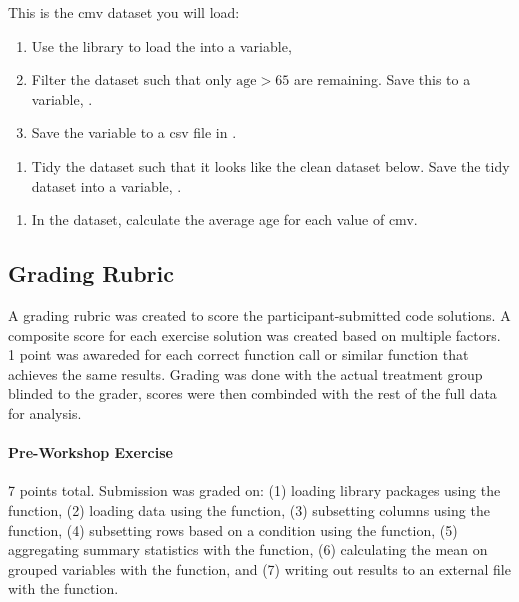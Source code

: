 \documentclass[040-assessment.tex]{subfiles}
\begin{document}
    \begin{displayquote}

        This is the cmv dataset you will load:

        \begin{enumerate}
            \item Use the  library to load the  into a variable, 
            \item Filter the  dataset such that only $\text{age} > 65$ are remaining.
                  Save this to a variable, .
            \item Save the  variable to a csv file in .
        \end{enumerate}

        \begin{enumerate}
            \item Tidy the  dataset such that it looks like the clean dataset below.
                  Save the tidy dataset into a variable, .
        \end{enumerate}

        \begin{enumerate}
            \item In the  dataset, calculate the average age for each value of cmv.
        \end{enumerate}

    \end{displayquote}

\subsection{Grading Rubric}

    A grading rubric was created to score the participant-submitted code solutions.
    A composite score for each exercise solution was created based on multiple factors.
    1 point was awareded for each correct function call or similar function that achieves the same results.
    Grading was done with the actual treatment group blinded to the grader,
    scores were then combinded with the rest of the full data for analysis.

    \paragraph{Pre-Workshop Exercise}

        7 points total.
        Submission was graded on:
        (1) loading library packages using the  function,
        (2) loading data using the  function,
        (3) subsetting columns using the  function,
        (4) subsetting rows based on a condition using the  function,
        (5) aggregating summary statistics with the  function,
        (6) calculating the mean on grouped variables with the  function, and
        (7) writing out results to an external file with the  function.
\end{document}
